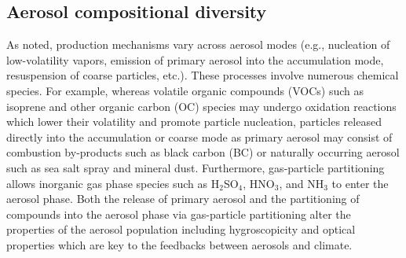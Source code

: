 \subsection{Aerosol compositional diversity}
As noted, production mechanisms vary across aerosol modes (e.g., nucleation of low-volatility vapors, emission of primary aerosol into the accumulation mode, resuspension of coarse particles, etc.). These processes involve numerous chemical species. For example, whereas volatile organic compounds (VOCs) such as isoprene and other organic carbon (OC) species may undergo oxidation reactions which lower their volatility and promote particle nucleation, particles released directly into the accumulation or coarse mode as primary aerosol may consist of combustion by-products such as black carbon (BC) or naturally occurring aerosol such as sea salt spray and mineral dust. Furthermore, gas-particle partitioning allows inorganic gas phase species such as H$_2$SO$_4$, HNO$_3$, and NH$_3$ to enter the aerosol phase. Both the release of primary aerosol and the partitioning of compounds into the aerosol phase via gas-particle partitioning alter the properties of the aerosol population including hygroscopicity and optical properties which are key to the feedbacks between aerosols and climate.  





